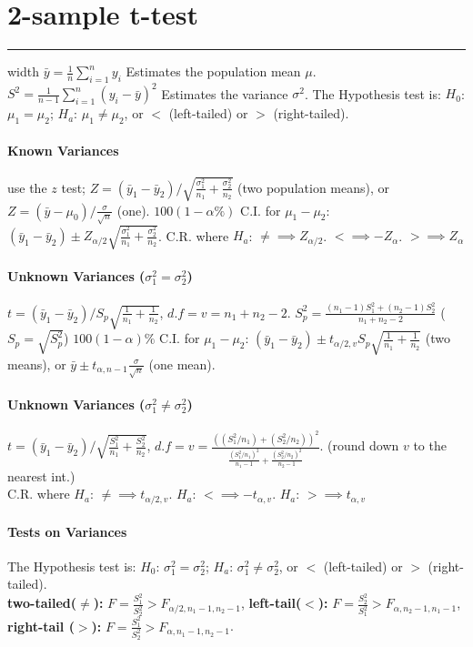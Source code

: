 \documentclass[10pt]{article}
\begin{document}
\section*{2-sample t-test}
\hrule width \textwidth
\vspace{6pt}
$\bar{y} = \frac{1}{n} \sum_{i=1}^{n} y_i$ Estimates the population mean $\mu$. $S^2 = \frac{1}{n-1}\sum_{i=1}^{n} (y_i - \bar{y})^2$ Estimates the variance $\sigma^2$. 
The Hypothesis test is:     $H_0$: $\mu_1 = \mu_2$; $H_a$: $\mu_1 \neq \mu_2$, or $<$ (left-tailed) or $>$ (right-tailed).
\paragraph{Known Variances} use the $z$ test; $Z = (\bar{y}_1 - \bar{y}_2) / \sqrt{\frac{\sigma_1^2}{n_1} + \frac{\sigma_2^2}{n_2}}$ (two population means), or $Z = (\bar{y} - \mu_0) / \frac{\sigma}{\sqrt{n}}$ (one). 
$100(1-\alpha\%)$ C.I. for $\mu_1 - \mu_2$: $(\bar{y}_1 - \bar{y}_2) \pm Z_{\alpha/2}\sqrt{\frac{\sigma_1^2}{n_1} + \frac{\sigma_2^2}{n_2}}$. 
C.R. where $H_a$: $\neq \implies Z_{\alpha / 2}$. $< \implies -Z_{\alpha}$. $> \implies Z_{\alpha}$  
\paragraph{Unknown Variances ($\sigma_1^2 = \sigma_2^2$)} $t = (\bar{y}_1 - \bar{y}_2) / S_p \sqrt{\frac{1}{n_1} + \frac{1}{n_2}}$, $d.f = v = n_1 + n_2 - 2$. $S_p^2 = \frac{(n_1 - 1)S_1^2 + (n_2 - 1)S_2^2}{n_1 + n_2 - 2}$ ($S_p = \sqrt{S_p^2}$)
$100(1-\alpha)\%$ C.I. for $\mu_1 - \mu_2$: $(\bar{y}_1 - \bar{y}_2) \pm t_{\alpha/2, v}S_p \sqrt{\frac{1}{n_1} + \frac{1}{n_2}}$ (two means), or $\bar{y} \pm t_{\alpha,n-1}\frac{\sigma}{\sqrt{n}}$ (one mean).
\paragraph{Unknown Variances ($\sigma_1^2 \neq \sigma_2^2$)} $t = (\bar{y}_1 - \bar{y}_2) / \sqrt{\frac{S_1^2}{n_1} + \frac{S_2^2}{n_2}}$, $d.f = v = \frac{((S_1^2/n_1) + (S_2^2/n_2))^2}{\frac{(S_1^2/n_1)^2}{n_1 - 1} + \frac{(S_2^2/n_2)^2}{n_2 - 1}}$. (round down $v$ to the nearest int.) \\
C.R. where $H_a$: $\neq \implies t_{\alpha / 2, v}$. $H_a$: $< \implies -t_{\alpha, v}$. $H_a$: $> \implies t_{\alpha, v}$ 
\paragraph{Tests on Variances}
The Hypothesis test is:     $H_0$: $\sigma_1^2 = \sigma_2^2$; $H_a$: $\sigma_1^2 \neq \sigma_2^2$, or $<$ (left-tailed) or $>$ (right-tailed).\\
\textbf{two-tailed($\neq$):} $F = \frac{S_1^2}{S_2^2} > F_{\alpha/2, n_1 - 1, n_2 - 1}$, 
\textbf{left-tail($<$):} $F = \frac{S_2^2}{S_1^2} > F_{\alpha, n_2 - 1, n_1 - 1}$, 
\textbf{right-tail ($>$):} $F = \frac{S_1^2}{S_2^2} > F_{\alpha, n_1 - 1, n_2 - 1}$.
\end{document}
